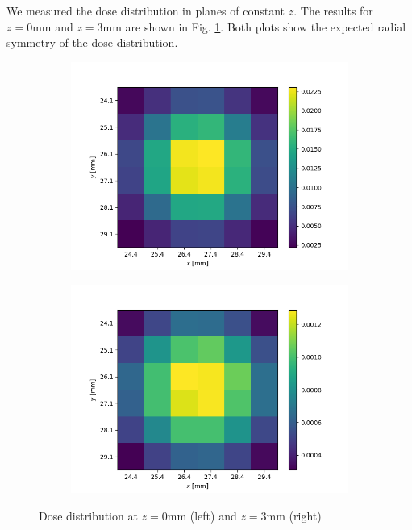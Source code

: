 \documentclass[a4paper,parskip]{scrartcl}
\begin{document}
We measured the dose distribution in planes of constant $z$. The results for $z=0\mathrm{mm}$ and $z=3\mathrm{mm}$ are shown in Fig. \ref{2D Plots}. Both plots show the expected radial symmetry of the dose distribution.

\begin{figure}
\centering
\begin{subfigure}{0.49\linewidth}
\includegraphics[width = \linewidth]{2D_Dose_Z0.png}
\end{subfigure}
\begin{subfigure}{0.49\linewidth}
\includegraphics[width = \linewidth]{2D_Dose_Z3.png}
\end{subfigure}
\caption{Dose distribution at $z=0\mathrm{mm}$ (left) and $z=3\mathrm{mm}$ (right)}
\label{2D Plots}
\end{figure}
\end{document}
